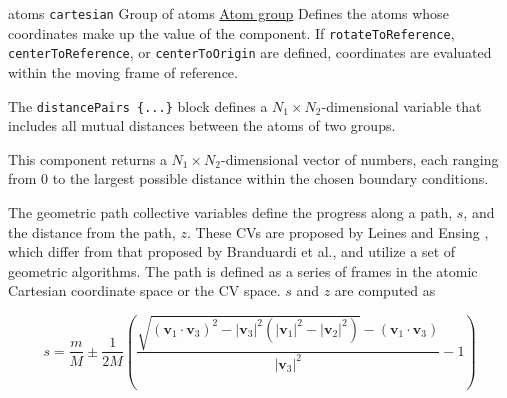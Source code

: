 \begin{cvcoptions}
\item %
  \key
    {atoms}{%
    \texttt{cartesian}}{%
    Group of atoms}{%
    \hyperref[sec:colvar_atom_groups]{Atom group}}{%
    Defines the atoms whose coordinates make up the value of the component.
    If \texttt{rotateToReference}, \texttt{centerToReference}, or \texttt{centerToOrigin} are defined, coordinates
    are evaluated within the moving frame of reference.}
\end{cvcoptions}



The \texttt{distancePairs~\{...\}} block defines a $N_{\mathrm{1}}\times{}N_{\mathrm{2}}$-dimensional variable that includes all mutual distances between the atoms of two groups.
\ifdefined{}\fi

\begin{cvcoptions}
\item %
\item %
\end{cvcoptions}
This component returns a $N_{\mathrm{1}}\times{}N_{\mathrm{2}}$-dimensional vector of numbers, each ranging from $0$ to the largest possible distance within the chosen boundary conditions.



The geometric path collective variables define the progress along a path, $s$, and the distance from the path, $z$. These CVs are proposed by Leines and Ensing\cite{Leines2012} , which differ from that\cite{Branduardi2007} proposed by Branduardi et al., and utilize a set of geometric algorithms. The path is defined as a series of frames in the atomic Cartesian coordinate space or the CV space. $s$ and $z$ are computed as

\begin{equation}
s = \frac{m}{M} \pm \frac{1}{2M} \left( \frac{\sqrt{(\mathbf{v}_1 \cdot \mathbf{v}_3)^2-|\mathbf{v}_3|^2 (|\mathbf{v}_1|^2 - |\mathbf{v}_2|^2)}-(\mathbf{v}_1 \cdot \mathbf{v}_3)}{|\mathbf{v}_3|^2} -1 \right)
\end{equation}

